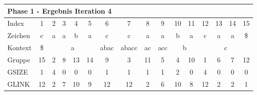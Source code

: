 \begin{table}[H]
\centering
\begin{adjustbox}{max width=\textwidth}
\begin{tabular}{lccccccccccccccc}
\multicolumn{16}{l}{Phase 1 - Ergebnis Iteration 4}                                                                                                                                                                                                                                                          \\ \hline
\multicolumn{1}{l|}{Index}   & 1                       & 2   & 3   & 4  & 5                       & 6                                                 & 7                          & \cellcolor[HTML]{\green}8 & 9                        & 10 & 11                        & 12  & 13  & 14  & 15  \\
\multicolumn{1}{l|}{Zeichen} & c                       & a   & a   & b  & a                       & c                                                 & c                          & a                         & a                        & b  & a                         & c   & a   & a   & \$  \\ \cline{1-16}
\multicolumn{1}{l|}{Kontext} & \multicolumn{1}{c|}{\$} & \multicolumn{4}{c|}{a}                   & \multicolumn{1}{c|}{\cellcolor[HTML]{\red}abac} & \multicolumn{1}{c|}{abacc} & \multicolumn{1}{c|}{ac}   & \multicolumn{1}{c|}{acc} & \multicolumn{2}{c|}{b}         & \multicolumn{4}{c}{c} \\
\multicolumn{1}{l|}{Gruppe}      & \multicolumn{1}{c|}{15} & 2   & 8   & 13 & \multicolumn{1}{c|}{14} & \multicolumn{1}{c|}{9}                            & \multicolumn{1}{c|}{3}     & \multicolumn{1}{c|}{11}   & \multicolumn{1}{c|}{5}   & 4  & \multicolumn{1}{c|}{10}   & 1   & 6   & 7   & 12  \\
\multicolumn{1}{l|}{GSIZE}   & \multicolumn{1}{c|}{1}  & 4   & 0   & 0  & \multicolumn{1}{c|}{0}  & \multicolumn{1}{c|}{1}                            & \multicolumn{1}{c|}{1}     & \multicolumn{1}{c|}{1}    & \multicolumn{1}{c|}{1}   & 2  & \multicolumn{1}{c|}{0}    & 4   & 0   & 0   & 0   \\
\multicolumn{1}{l|}{GLINK}   & 12                      & 2   & 7   & 10 & 9                       & 12                                                & 12                         & 2                         & 6                        & 10 & 8                         & 12  & 2   & 2   & 1   \\

\end{tabular}
\end{adjustbox}
\end{table}
